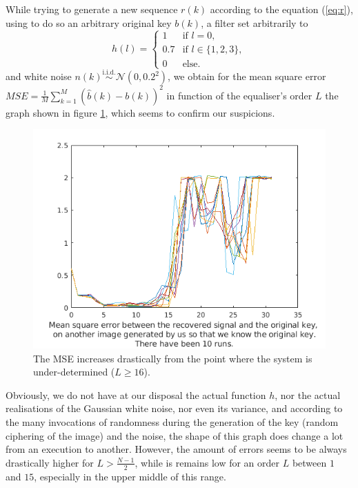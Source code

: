 \documentclass[twocolumn, 12pt]{IEEEtran}
\begin{document}
While trying to generate a new sequence $r(k)$ according to the equation (\ref{eq:r}), using to do so an arbitrary original key $b(k)$, a filter set arbitrarily to 
$$
h(l) =
\left\{
	\begin{array}{ll}
		1  & \mbox{if } l = 0, \\
		0.7 & \mbox{if } l \in \{1, 2, 3\}, \\
		0 & \mbox{else.}
	\end{array}
\right.
$$
and white noise $n(k) \stackrel{\text{i.i.d.}}{\sim } \mathcal{N}(0, 0.2^2)$, we obtain for the mean square error ${MSE = \frac{1}{M}\sum\limits_{k=1}^{M}(\hat{b}(k)-b(k))^2}$ in function of the equaliser's order $L$ the graph shown in figure \ref{fig:g}, which seems to confirm our suspicions.
\begin{figure}[h]
   \begin{center}
      \includegraphics[width=.8\linewidth]{tse4.png}
   \end{center}
\vspace{-0.6cm}
\caption{The MSE increases drastically from the point where the system is under-determined ($L\geq 16$).}
\label{fig:g}
\end{figure}
Obviously, we do not have at our disposal the actual function $h$, nor the actual realisations of the Gaussian white noise, nor even its variance, and according to the many invocations of randomness during the generation of the key (random ciphering of the image) and the noise, the shape of this graph does change a lot from an execution to another. However, the amount of errors seems to be always drastically higher for $L > \frac{N-1}{2}$, while is remains low for an order $L$ between $1$ and $15$, especially in the upper middle of this range.
\end{document}
